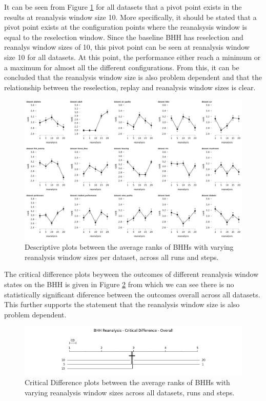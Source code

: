 It can be seen from Figure \ref{fig:results:reanalysis:descriptive:descriptive} for all datasets that a pivot point exists in the results at reanalysis window size 10. More specifically, it should be stated that a pivot point exists at the configuration points where the reanalsysis window is equal to the reselection window. Since the baseline \Ac{BHH} has reselection and reanalys window sizes of 10, this pivot point can be seen at reanalysis window size 10 for all datasets. At this point, the performance either reach a minimum or a maximum for almost all the different configurations. From this, it can be concluded that the reanalysis window size is also problem dependent and that the relationship between the reselection, replay and reanalysis window sizes is clear.

\begin{figure}[htbp]
	\centering
	\includegraphics[width=\textwidth]{analysis/bhh_reanalysis/figures/descriptive/descriptive.png}
	\caption{Descriptive plots between the average ranks of \Acsp{BHH} with varying reanalysis window sizes per dataset, across all runs and steps.}
	\label{fig:results:reanalysis:descriptive:descriptive}
\end{figure}

The critical difference plots beyween the outcomes of different reanalysis window states on the \Ac{BHH} is given in Figure \ref{fig:results:reanalysis:descriptive:cd} from which we can see there is no statistically significant diference between the outcomes overall across all datasets. This further supports the statement that the reanalysis window size is also problem dependent.


\begin{figure}[htbp]
	\centering
	\includegraphics[width=\textwidth]{analysis/bhh_reanalysis/figures/cd/overall.png}
	\caption{Critical Difference plots between the average ranks of \Acsp{BHH} with varying reanalysis window sizes across all datasets, runs and steps.}
	\label{fig:results:reanalysis:descriptive:cd}
\end{figure}

